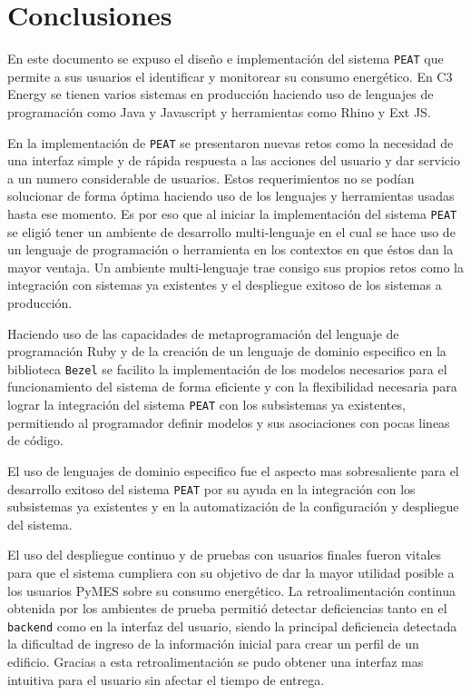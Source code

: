 \chapter{Conclusiones}

En este documento se expuso el diseño e implementación del sistema \texttt{PEAT} que
permite a sus usuarios el identificar y monitorear su consumo energético. En C3
Energy se tienen varios sistemas en producción haciendo uso de lenguajes de
programación como Java y Javascript y herramientas como Rhino y Ext JS.

En la implementación de \texttt{PEAT} se presentaron nuevas retos como la necesidad
de una interfaz simple y de rápida respuesta a las acciones del usuario y
dar servicio a un numero considerable de usuarios.
Estos requerimientos no se podían solucionar de forma óptima haciendo uso de los
lenguajes y herramientas usadas hasta ese momento. Es por eso que al iniciar
la implementación del sistema \texttt{PEAT} se eligió tener un ambiente de
desarrollo multi-lenguaje en el cual se hace uso de un lenguaje de programación
o herramienta en los contextos en que éstos dan la mayor ventaja. Un ambiente
multi-lenguaje trae consigo sus propios retos como la integración con sistemas ya
existentes y el despliegue exitoso de los sistemas a producción.

Haciendo uso de las capacidades de metaprogramación del lenguaje de programación
Ruby y de la creación de un lenguaje de dominio especifico en la biblioteca
\texttt{Bezel} se facilito la implementación de los modelos necesarios para
el funcionamiento del sistema de forma eficiente y con la flexibilidad necesaria
para lograr la integración del sistema \texttt{PEAT} con los subsistemas ya
existentes, permitiendo al programador definir modelos y sus asociaciones con
pocas lineas de código.

El uso de lenguajes de dominio especifico fue el aspecto mas sobresaliente
para el desarrollo exitoso del sistema \texttt{PEAT} por su ayuda en la
integración con los subsistemas ya existentes y en la automatización de la
configuración y despliegue del sistema.

El uso del despliegue continuo y de pruebas con usuarios finales fueron vitales para
que el sistema cumpliera con su objetivo de dar la mayor utilidad posible
a los usuarios PyMES sobre su consumo energético. La retroalimentación continua
obtenida por los ambientes de prueba permitió detectar deficiencias tanto en el
\texttt{backend} como en la interfaz del usuario, siendo la principal deficiencia
detectada la dificultad de ingreso de la información inicial para crear un perfil
de un edificio. Gracias a esta retroalimentación se pudo obtener una interfaz
mas intuitiva para el usuario sin afectar el tiempo de entrega.

